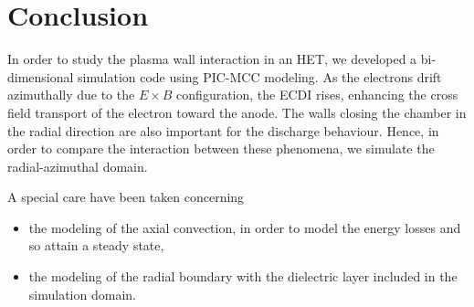 


\section{Conclusion}
  \label{sec-conclusion_ch1}
  
  In order to study the plasma wall interaction in an \ac{HET}, we developed a bi-dimensional simulation code using \ac{PIC}-\ac{MCC} modeling.
  As the electrons drift azimuthally due to the $E \times B$ configuration, the \ac{ECDI} rises, enhancing the cross field transport of the electron toward the anode.
  The walls closing the chamber in the radial direction are also important for the discharge behaviour.
  Hence, in order to compare the interaction between these phenomena, we simulate the radial-azimuthal domain.
  
  A special care have been taken concerning
  \begin{itemize}
    \item the modeling of the axial convection, in order to model the energy losses and so attain a steady state,
    \item the modeling of the radial boundary with the dielectric layer included in the simulation domain.
  \end{itemize}
  
  
  